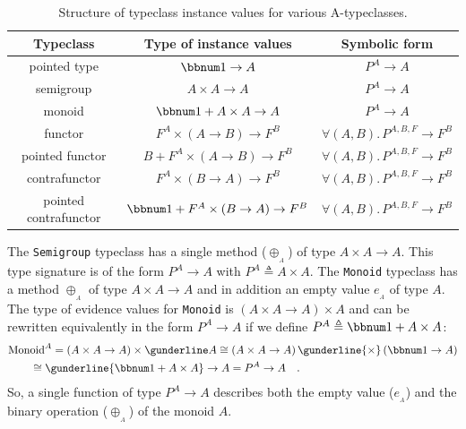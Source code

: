 \begin{table}
\begin{centering}
\begin{tabular}{|c|c|c|}
\hline 
\textbf{\small{}Typeclass} & \textbf{\small{}Type of instance values} & \textbf{\small{}Symbolic form}\tabularnewline
\hline 
\hline 
{\small{}pointed type} & {\small{}$\bbnum 1\rightarrow A$} & {\small{}$P^{A}\rightarrow A$}\tabularnewline
\hline 
{\small{}semigroup} & {\small{}$A\times A\rightarrow A$} & {\small{}$P^{A}\rightarrow A$}\tabularnewline
\hline 
{\small{}monoid} & {\small{}$\bbnum 1+A\times A\rightarrow A$} & {\small{}$P^{A}\rightarrow A$}\tabularnewline
\hline 
{\small{}functor} & {\small{}$F^{A}\times\left(A\rightarrow B\right)\rightarrow F^{B}$} & {\small{}$\forall(A,B).\,P^{A,B,F}\rightarrow F^{B}$}\tabularnewline
\hline 
{\small{}pointed functor} & {\small{}$B+F^{A}\times\left(A\rightarrow B\right)\rightarrow F^{B}$} & {\small{}$\forall(A,B).\,P^{A,B,F}\rightarrow F^{B}$}\tabularnewline
\hline 
{\small{}contrafunctor} & {\small{}$F^{A}\times(B\rightarrow A)\rightarrow F^{B}$} & {\small{}$\forall(A,B).\,P^{A,B,F}\rightarrow F^{B}$}\tabularnewline
\hline 
{\small{}pointed contrafunctor} & {\small{}$\bbnum 1+F^{A}\times\left(B\rightarrow A\right)\rightarrow F^{B}$} & {\small{}$\forall(A,B).\,P^{A,B,F}\rightarrow F^{B}$}\tabularnewline
\hline 
\end{tabular}
\par\end{centering}
\caption{Structure of typeclass instance values for various A-typeclasses.\label{tab:Types-of-typeclass-instance-values}}
\end{table}

The \lstinline!Semigroup! typeclass has a single method ($\oplus_{_{A}}$)
of type $A\times A\rightarrow A$. This type signature is of the form
$P^{A}\rightarrow A$ with $P^{A}\triangleq A\times A$. The \lstinline!Monoid!
typeclass has a method $\oplus_{_{A}}$ of type $A\times A\rightarrow A$
and in addition an empty value $e_{_{A}}$ of type $A$. The type
of evidence values for \lstinline!Monoid! is $(A\times A\rightarrow A)\times A$
and can be rewritten equivalently in the form $P^{A}\rightarrow A$
if we define $P^{A}\triangleq\bbnum 1+A\times A$:
\begin{align*}
 & \text{Monoid}^{A}=\left(A\times A\rightarrow A\right)\times\gunderline A\cong\left(A\times A\rightarrow A\right)\gunderline{\times}\,(\bbnum 1\rightarrow A)\\
 & \quad\quad\cong\gunderline{\bbnum 1+A\times A}\rightarrow A=P^{A}\rightarrow A\quad.
\end{align*}
So, a single function of type $P^{A}\rightarrow A$ describes both
the empty value ($e_{_{A}}$) and the binary operation ($\oplus_{_{A}}$)
of the monoid $A$.

